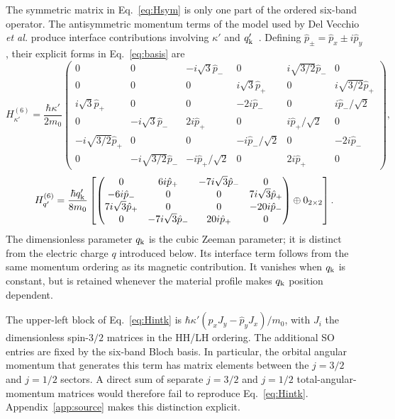 The symmetric matrix in Eq.~\eqref{eq:Hsym} is only one part of the ordered six-band operator. The antisymmetric momentum terms of the model used by Del Vecchio \emph{et al.} produce interface contributions involving $\kappa'$ and $q_{\mathrm k}'$~\cite{delvecchio2026}. Defining $ \hat{p}_ \pm= \hat{p}_ x\pm i \hat{p}_ y$, their explicit forms in Eq.~\eqref{eq:basis} are
\begin{equation}
H_{\kappa'}^{(6)}=\frac{\hbar\kappa'}{2m_0}
\begin{pmatrix}
0&0&-i\sqrt3 \hat{p}_ -&0&i\sqrt{3/2} \hat{p}_ -&0\\
0&0&0&i\sqrt3 \hat{p}_ +&0&i\sqrt{3/2} \hat{p}_ +\\
i\sqrt3 \hat{p}_ +&0&0&-2i \hat{p}_ -&0&i \hat{p}_ -/\sqrt2\\
0&-i\sqrt3 \hat{p}_ -&2i \hat{p}_ +&0&i \hat{p}_ +/\sqrt2&0\\
-i\sqrt{3/2} \hat{p}_ +&0&0&-i \hat{p}_ -/\sqrt2&0&-2i \hat{p}_ -\\
0&-i\sqrt{3/2} \hat{p}_ -&-i \hat{p}_ +/\sqrt2&0&2i \hat{p}_ +&0
\end{pmatrix},
\label{eq:Hintk}
\end{equation}
\begin{equation}
H_{q'}^{(6)}=\frac{\hbar q_{\mathrm k}'}{8m_0}
\left[
\begin{pmatrix}
0&6i \hat{p}_ +&-7i\sqrt3 \hat{p}_ -&0\\
-6i \hat{p}_ -&0&0&7i\sqrt3 \hat{p}_ +\\
7i\sqrt3 \hat{p}_ +&0&0&-20i \hat{p}_ -\\
0&-7i\sqrt3 \hat{p}_ -&20i \hat{p}_ +&0
\end{pmatrix}\oplus0_{2\times2}
\right].
\label{eq:Hintq}
\end{equation}
The dimensionless parameter $q_{\mathrm k}$ is the cubic Zeeman parameter; it is distinct from the electric charge $q$ introduced below. Its interface term follows from the same momentum ordering as its magnetic contribution. It vanishes when $q_{\mathrm k}$ is constant, but is retained whenever the material profile makes $q_{\mathrm k}$ position dependent.

The upper-left block of Eq.~\eqref{eq:Hintk} is $\hbar\kappa'( \hat{p}_ xJ_y- \hat{p}_ yJ_x)/m_0$, with $J_i$ the dimensionless spin-$3/2$ matrices in the HH/LH ordering. The additional SO entries are fixed by the six-band Bloch basis. In particular, the orbital angular momentum that generates this term has matrix elements between the $j=3/2$ and $j=1/2$ sectors. A direct sum of separate $j=3/2$ and $j=1/2$ total-angular-momentum matrices would therefore fail to reproduce Eq.~\eqref{eq:Hintk}. Appendix~\ref{app:source} makes this distinction explicit.

